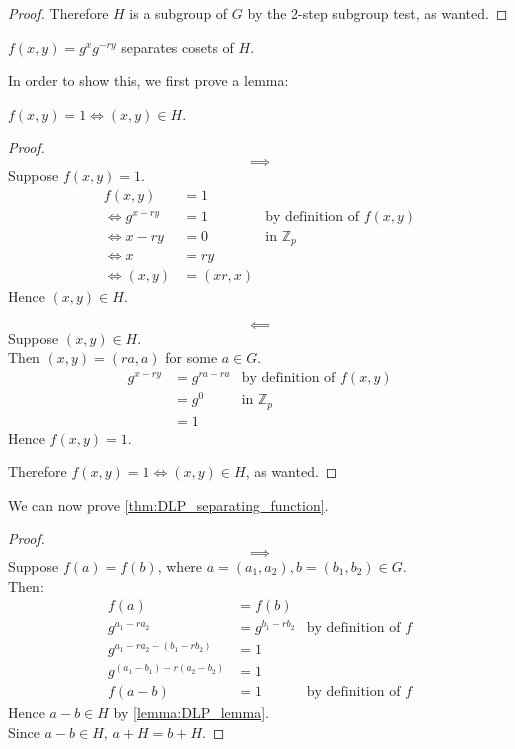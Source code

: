 \documentclass{beamer}
\newcommand{\bb}[1]{\mathbb{#1}}
\begin{document}
\begin{frame}
\begin{proof}
            Therefore $H$ is a subgroup of $G$ by the 2-step subgroup test, as wanted.
        \end{proof}
        \begin{theorem}\label{thm:DLP_separating_function}
            $f(x, y) = g^x g^{-ry}$ separates cosets of $H$.
        \end{theorem}
        In order to show this, we first prove a lemma:
        \begin{lemma}\label{lemma:DLP_lemma}
                $f(x, y) = 1 \iff (x, y) \in H$.
        \end{lemma}
        \begin{proof}
                $$\implies$$
                Suppose $f(x,y) = 1$.
                \begin{align*}
                        f(x, y) &= 1\\
                        \iff g^{x - ry} &= 1 & \text{by definition of $f(x, y)$}\\
                        \iff x - ry &= 0 & \text{in $\bb{Z}_p$}\\
                        \iff x &= ry\\
                        \iff (x, y) &= (xr, x)
                \end{align*}
                Hence $(x, y) \in H$.

                $$\impliedby$$
                Suppose $(x, y) \in H$.\\
                Then $(x, y) = (ra, a)$ for some $a \in G$.
                \begin{align*}
                        g^{x - ry} &= g^{ra - ra} & \text{by definition of $f(x, y)$}\\
                        &= g^0 & \text{in $\bb{Z}_p$}\\
                        &= 1
                \end{align*}
                Hence $f(x, y) = 1$.

                Therefore $f(x,y) = 1 \iff (x,y) \in H$, as wanted.
        \end{proof}

        We can now prove \ref{thm:DLP_separating_function}.
        \begin{proof}
                        $$\implies$$
                Suppose $f(a) = f(b)$, where $a = (a_1, a_2), b = (b_1, b_2) \in G$.\\
                Then:
                \begin{align*}
                        f(a) &= f(b)\\
                        g^{a_1 - r a_2} &= g^{b_1 - r b_2} & \text{by definition of $f$}\\
                        g^{a_1 - r a_2 - (b_1 - r b_2)} &= 1\\
                        g^{(a_1 - b_1) - r(a_2 - b_2)} &= 1\\
                        f(a - b) &= 1 & \text{by definition of $f$}
                \end{align*}
                Hence $a - b \in H$ by \ref{lemma:DLP_lemma}.\\
                Since $a - b \in H$, $a + H = b + H$.


\end{proof}
\end{frame}
\end{document}
